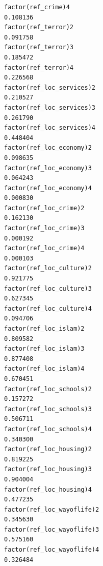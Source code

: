 \documentclass[
]{article}
\begin{document}
\begin{table}
\begin{minipage}[t]{\linewidth}
{\begin{verbatim}
factor(ref_crime)4                                                                0.108136
factor(ref_terror)2                                                               0.091758
factor(ref_terror)3                                                               0.185472
factor(ref_terror)4                                                               0.226568
factor(ref_loc_services)2                                                         0.210527
factor(ref_loc_services)3                                                         0.261790
factor(ref_loc_services)4                                                         0.448404
factor(ref_loc_economy)2                                                          0.098635
factor(ref_loc_economy)3                                                          0.064243
factor(ref_loc_economy)4                                                          0.000830
factor(ref_loc_crime)2                                                            0.162130
factor(ref_loc_crime)3                                                            0.000192
factor(ref_loc_crime)4                                                            0.000103
factor(ref_loc_culture)2                                                          0.921775
factor(ref_loc_culture)3                                                          0.627345
factor(ref_loc_culture)4                                                          0.094706
factor(ref_loc_islam)2                                                            0.809582
factor(ref_loc_islam)3                                                            0.877408
factor(ref_loc_islam)4                                                            0.670451
factor(ref_loc_schools)2                                                          0.157272
factor(ref_loc_schools)3                                                          0.506711
factor(ref_loc_schools)4                                                          0.340300
factor(ref_loc_housing)2                                                          0.819225
factor(ref_loc_housing)3                                                          0.904004
factor(ref_loc_housing)4                                                          0.477235
factor(ref_loc_wayoflife)2                                                        0.345630
factor(ref_loc_wayoflife)3                                                        0.575160
factor(ref_loc_wayoflife)4                                                        0.326484
                                                                                     

\end{verbatim}}
\end{minipage}
\end{table}
\end{document}
